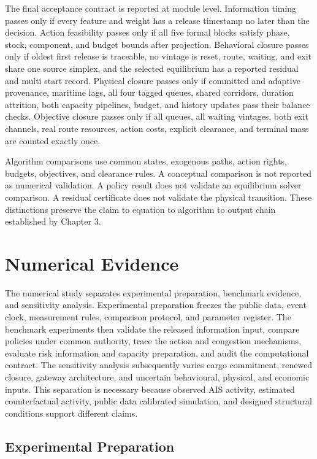 \documentclass[a4paper,fleqn]{cas-sc}
\begin{document}
The final acceptance contract is reported at module level. Information timing
passes only if every feature and weight has a release timestamp no later than
the decision. Action feasibility passes only if all five formal blocks satisfy
phase, stock, component, and budget bounds after projection. Behavioral closure
passes only if oldest first release is traceable, no vintage is reset, route,
waiting, and exit share one source simplex, and the selected equilibrium has a
reported residual and multi start record. Physical closure passes only if
committed and adaptive provenance, maritime lags, all four tagged queues,
shared corridors, duration attrition, both capacity pipelines, budget, and
history updates pass their balance checks. Objective closure passes only if all
queues, all waiting vintages, both exit channels, real route resources, action
costs, explicit clearance, and terminal mass are counted exactly once.

Algorithm comparisons use common states, exogenous paths, action rights,
budgets, objectives, and clearance rules. A conceptual comparison is not
reported as numerical validation. A policy result does not validate an
equilibrium solver comparison. A residual certificate does not validate the
physical transition. These distinctions preserve the claim to equation to
algorithm to output chain established by Chapter 3.


\section{Numerical Evidence}
\label{sec:numerical}


The numerical study separates experimental preparation, benchmark evidence,
and sensitivity analysis. Experimental preparation freezes the public data,
event clock, measurement rules, comparison protocol, and parameter register.
The benchmark experiments then validate the released information input,
compare policies under common authority, trace the action and congestion
mechanisms, evaluate risk information and capacity preparation, and audit the
computational contract. The sensitivity analysis subsequently varies cargo
commitment, renewed closure, gateway architecture, and uncertain behavioural,
physical, and economic inputs. This separation is necessary because observed
AIS activity, estimated counterfactual activity, public data calibrated
simulation, and designed structural conditions support different claims.

\subsection{Experimental Preparation}
\label{subsec:final-data-design}
\end{document}
